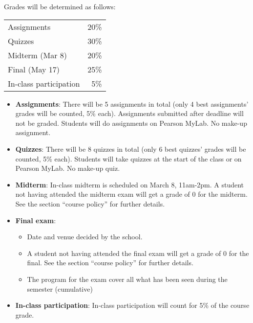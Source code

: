 \documentclass[12]{article}
\begin{document}
Grades will be determined as follows:
\begin{table}[!h] \centering 
	\label{tab:grades} 
	\begin{tabularx}{0.5\textwidth}{Xr} 
		\toprule
		Assignments         & 20\%  \\
		Quizzes             & 30\% \\
		Midterm	(Mar 8)            & 20\% \\
		Final (May 17)              & 25\% \\
		In-class participation						& 5\% \\
		\bottomrule
	\end{tabularx} 
\end{table} 

\begin{itemize}
    \item \textbf{Assignments}: There will be 5 assignments in total (only 4 best assignments' grades will be counted, 5\% each). Assignments submitted after deadline will not be graded. Students will do assignments on Pearson MyLab. No make-up assignment.
    \item \textbf{Quizzes}: There will be 8 quizzes in total (only 6 best quizzes' grades will be counted, 5\% each). Students will take quizzes at the start of the class or on Pearson MyLab. No make-up quiz.
    \item \textbf{Midterm}: In-class midterm is scheduled on March 8, 11am-2pm. A student not having attended the midterm exam will get a grade of 0 for the midterm. See the section ``course policy'' for further details.
    \item \textbf{Final exam}:
    \begin{itemize}
    \item Date and venue decided by the school. 
    \item A student not having attended the final exam will get a
    grade of 0 for the final.  See the
    section ``course policy'' for further details.
    \item The program for the exam cover all what has been seen during
    the semester (cumulative)
    \end{itemize}
    \item \textbf{In-class participation}: In-class participation will count for 5\% of the course grade.
\end{itemize}
\end{document}
